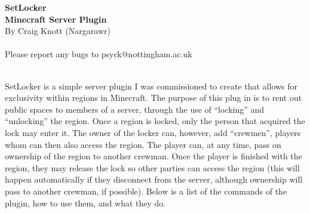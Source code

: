 \documentclass[a4paper,twoside,notitlepage,11pt]{article}
\newcommand{\nin}{\noindent}
\begin{document}
\begin{center}
   \textbf{SetLocker\ \\Minecraft Server Plugin} \ \\
   By Craig Knott (Nargarawr) \ \\
   \ \\
   Please report any bugs to psyck@nottingham.ac.uk
\end{center}
\ \\
\nin
SetLocker is a simple server plugin I was commissioned to create that allows for exclusivity within regions in Minecraft. The purpose of this plug in is to rent out public spaces to members of a server, through the use of ``locking'' and ``unlocking'' the region. Once a region is locked, only the person that acquired the lock may enter it. The owner of the locker can, however, add ``crewmen'', players whom can then also access the region. The player can, at any time, pass on ownership of the region to another crewman. Once the player is finished with the region, they may release the lock so other parties can access the region (this will happen automatically if they disconnect from the server, although ownership will pass to another crewman, if possible). Below is a list of the commands of the plugin, how to use them, and what they do.
\end{document}
